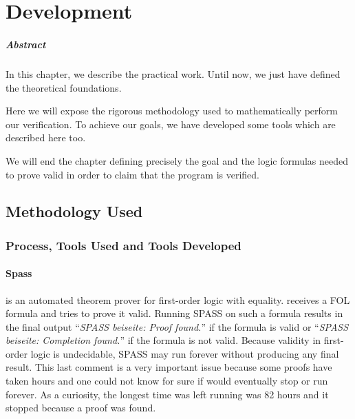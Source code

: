 \chapter{Development\label{sec:develpment}}

\paragraph{Abstract} 

In this chapter, we describe the practical work.
%
Until now, we just have defined the theoretical foundations.

Here we will expose the rigorous methodology used to mathematically perform our verification.
%
To achieve our goals, we have developed some tools which are described here too.

We will end the chapter defining precisely the goal and the logic formulas needed to prove valid in order to claim that the program is verified.

\section{Methodology Used}

\subsection{Process, Tools Used and Tools Developed}

\subsubsection{Spass}

\spass \cite{spass} is an automated theorem prover for first-order logic with equality. 
%
\spass receives a \gls{FOL} formula and tries to prove it valid.
% 
Running SPASS on such a formula results in the final output “\textit{SPASS beiseite: Proof found.}” if the formula is valid or  “\textit{SPASS beiseite: Completion found.}” if the formula is not valid.
%
Because validity in first-order logic is undecidable, SPASS may run forever without producing any final result.
%
This last comment is a very important issue because some proofs have taken hours and one could not know for sure if \spass would eventually stop or run forever.
%
As a curiosity, the longest time \spass was left running was 82 hours and it stopped because a proof was found.


